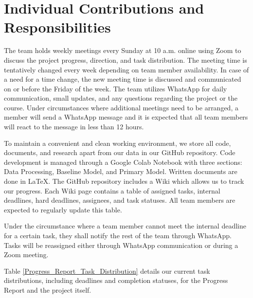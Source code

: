 \documentclass{article} %
\begin{document}
\section{Individual Contributions and Responsibilities}

The team holds weekly meetings every Sunday at 10 a.m. online using Zoom to discuss the project progress, direction, and task distribution. The meeting time is tentatively changed every week depending on team member availability. In case of a need for a time change, the new meeting time is discussed and communicated on or before the Friday of the week. The team utilizes WhatsApp for daily communication, small updates, and any questions regarding the project or the course. Under circumstances where additional meetings need to be arranged, a member will send a WhatsApp message and it is expected that all team members will react to the message in less than 12 hours.

To maintain a convenient and clean working environment, we store all code, documents, and research apart from our data in our GitHub repository. Code development is managed through a Google Colab Notebook with three sections: Data Processing, Baseline Model, and Primary Model. Written documents are done in LaTeX. The GitHub repository includes a Wiki which allows us to track our progress. Each Wiki page contains a table of assigned tasks, internal deadlines, hard deadlines, assignees, and task statuses. All team members are expected to regularly update this table.

Under the circumstance where a team member cannot meet the internal deadline for a certain task, they shall notify the rest of the team through WhatsApp. Tasks will be reassigned either through WhatsApp communication or during a Zoom meeting.

Table \ref{Progress_Report_Task_Distribution} details our current task distributions, including deadlines and completion statuses, for the Progress Report and the project itself.
\end{document}
